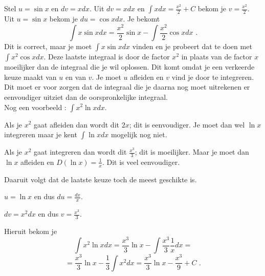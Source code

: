\documentclass{article}
\begin{document}
Stel $u=\sin x$ en $dv=xdx$.
Uit $dv=xdx$ en $\int xdx = \frac{x^2}{2}+C$ bekom je $v=\frac{x^2}{2}$.
Uit $u=\sin x$ bekom je $du=\cos x dx$.
Je bekomt
\[
\int x \sin x dx=\frac{x^2}{2} \sin x-\int \frac{x^2}{2} \cos x dx \text { .}
\]
Dit is correct, maar je moet $\int x \sin x dx$ vinden en je probeert dat te doen met $\int x^2 \cos xdx$.
Deze laatste integraal is door de factor $x^2$ in plaats van de factor $x$ moeilijker dan de integraal die je wil oplossen.
Dit komt omdat je een verkeerde keuze maakt van $u$ en van $v$.
Je  moet $u$ afleiden en $v$ vind je door te integreren.
Dit moet er voor zorgen dat de integraal die je daarna nog moet uitrekenen er eenvoudiger uitziet dan de oorspronkelijke integraal.\\

Nog een voorbeeld : $\int x^2 \ln x dx$.

Als  je $x^2$ gaat afleiden dan wordt dit $2x$; dit is eenvoudiger. 
Je moet dan wel $\ln x$ integreren maar je kent $\int \ln x dx$ mogelijk nog niet.

Als je $x^2$ gaat integreren dan wordt dit $\frac{x^3}{3}$; dit is moeilijker.
Maar je moet dan $\ln x$ afleiden en $D (\ln x) = \frac{1}{x}$.
Dit is veel eenvoudiger.

Daaruit volgt dat de laatste keuze toch de meest geschikte is.

$u=\ln x$ en dus $du=\frac{dx}{x}$.

$dv=x^2dx$ en dus $v=\frac{x^3}{3}$.

Hieruit bekom je
\[
\int x^2 \ln x dx=\frac{x^3}{3} \ln x-\int \frac{x^3}{3}\frac{1}{x}dx=
\]
\[
=\frac{x^3}{3} \ln x-\frac{1}{3} \int x^2 dx=\frac{x^3}{3} \ln x -\frac{x^3}{9}+C \text { .}
\]
\end{document}
